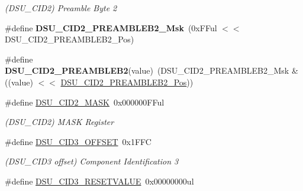 \begin{DoxyCompactItemize}
\begin{DoxyCompactList}\small\item\em (D\+S\+U\+\_\+\+C\+I\+D2) Preamble Byte 2 \end{DoxyCompactList}\item 
\hypertarget{group___s_a_m_l21___d_s_u_gac588c40c7349a7b9803a8e38bfe9118a}{}\#define {\bfseries D\+S\+U\+\_\+\+C\+I\+D2\+\_\+\+P\+R\+E\+A\+M\+B\+L\+E\+B2\+\_\+\+Msk}~(0x\+F\+Ful $<$$<$ D\+S\+U\+\_\+\+C\+I\+D2\+\_\+\+P\+R\+E\+A\+M\+B\+L\+E\+B2\+\_\+\+Pos)\label{group___s_a_m_l21___d_s_u_gac588c40c7349a7b9803a8e38bfe9118a}

\item 
\hypertarget{group___s_a_m_l21___d_s_u_ga826f45b240e84f67a102fd541f6184f1}{}\#define {\bfseries D\+S\+U\+\_\+\+C\+I\+D2\+\_\+\+P\+R\+E\+A\+M\+B\+L\+E\+B2}(value)~(D\+S\+U\+\_\+\+C\+I\+D2\+\_\+\+P\+R\+E\+A\+M\+B\+L\+E\+B2\+\_\+\+Msk \& ((value) $<$$<$ \hyperlink{group___s_a_m_l21___d_s_u_ga755afb0dc289f0eeaaf805636836da72}{D\+S\+U\+\_\+\+C\+I\+D2\+\_\+\+P\+R\+E\+A\+M\+B\+L\+E\+B2\+\_\+\+Pos}))\label{group___s_a_m_l21___d_s_u_ga826f45b240e84f67a102fd541f6184f1}

\item 
\hypertarget{group___s_a_m_l21___d_s_u_gaedee750a7bad4de75131402ddea84c91}{}\#define \hyperlink{group___s_a_m_l21___d_s_u_gaedee750a7bad4de75131402ddea84c91}{D\+S\+U\+\_\+\+C\+I\+D2\+\_\+\+M\+A\+S\+K}~0x000000\+F\+Ful\label{group___s_a_m_l21___d_s_u_gaedee750a7bad4de75131402ddea84c91}

\begin{DoxyCompactList}\small\item\em (D\+S\+U\+\_\+\+C\+I\+D2) M\+A\+S\+K Register \end{DoxyCompactList}\item 
\hypertarget{group___s_a_m_l21___d_s_u_ga9863199733ba4498f102f28fc2c40021}{}\#define \hyperlink{group___s_a_m_l21___d_s_u_ga9863199733ba4498f102f28fc2c40021}{D\+S\+U\+\_\+\+C\+I\+D3\+\_\+\+O\+F\+F\+S\+E\+T}~0x1\+F\+F\+C\label{group___s_a_m_l21___d_s_u_ga9863199733ba4498f102f28fc2c40021}

\begin{DoxyCompactList}\small\item\em (D\+S\+U\+\_\+\+C\+I\+D3 offset) Component Identification 3 \end{DoxyCompactList}\item 
\hypertarget{group___s_a_m_l21___d_s_u_ga8cfe3b4da150c87da70eccd4c07280f4}{}\#define \hyperlink{group___s_a_m_l21___d_s_u_ga8cfe3b4da150c87da70eccd4c07280f4}{D\+S\+U\+\_\+\+C\+I\+D3\+\_\+\+R\+E\+S\+E\+T\+V\+A\+L\+U\+E}~0x00000000ul\label{group___s_a_m_l21___d_s_u_ga8cfe3b4da150c87da70eccd4c07280f4}


\end{DoxyCompactItemize}
